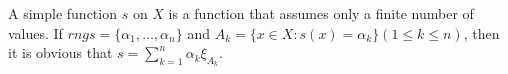 A simple function $s$ on $X$ is a function that assumes only a finite number of values. If $rngs = \{\alpha_1, \ldots, \alpha_n\}$ and $A_k = \{x \in X : s(x) = \alpha_k\} (1 \leq k \leq n)$, then it is obvious that $s = \sum_{k=1}^{n} \alpha_k \xi_{A_k}$.